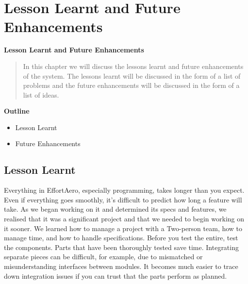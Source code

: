 \section{Lesson Learnt and Future Enhancements}

\vspace{20mm}


\Huge{\textbf{Lesson Learnt and Future Enhancements}}

\vspace{20mm}


\begin{abstract}

    In this chapter we will discuss the lessons learnt and future enhancements of the system.
    The lessons learnt will be discussed in the form of a list of problems and the future enhancements
    will be discussed in the form of a list of ideas.



\end{abstract}

\vspace{20mm}

\large{\textbf{Outline}}

\begin{center}
    \begin{itemize}
        \item Lesson Learnt
        \item Future Enhancements
    \end{itemize}
\end{center}
\pagebreak


\subsection{Lesson Learnt}

Everything in EffortAero, especially programming, takes longer than you expect.
Even if everything goes smoothly, it's difficult to predict how
long a feature will take. As we began working on it and determined
its specs and features, we realised that it was a significant project
and that we needed to begin working on it sooner. We learned how to
manage a project with a Two-person team, how to manage time, and
how to handle specifications.
Before you test the entire, test the components. Parts that have been
thoroughly tested save time. Integrating separate pieces can be difficult,
for example, due to mismatched or misunderstanding interfaces between modules.
It becomes much easier to trace down integration issues if you can trust
that the parts perform as planned.

